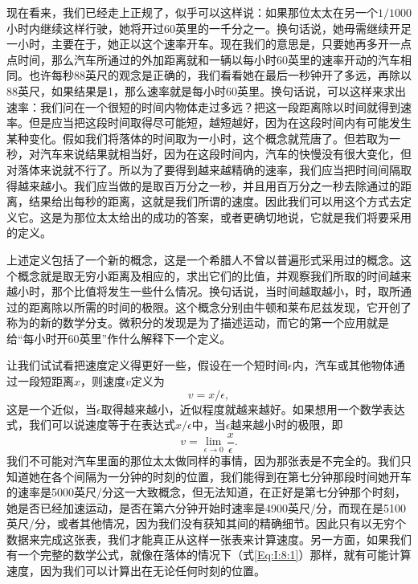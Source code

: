 现在看来，我们已经走上正规了，似乎可以这样说：如果那位太太在另一个$1/1000$小时内继续这样行驶，她将开过60英里的一千分之一。换句话说，她毋需继续开足一小时，主要在于，她正以这个速率开车。现在我们的意思是，只要她再多开一点点时间，那么汽车所通过的外加距离就和一辆以每小时60英里的速率开动的汽车相同。也许每秒88英尺的观念是正确的，我们看看她在最后一秒钟开了多远，再除以88英尺，如果结果是1，那么速率就是每小时60英里。换句话说，可以这样来求出速率：我们问在一个很短的时间内物体走过多远？把这一段距离除以时间就得到速率。但是应当把这段时间取得尽可能短，越短越好，因为在这段时间内有可能发生某种变化。假如我们将落体的时间取为一小时，这个概念就荒唐了。但若取为一秒，对汽车来说结果就相当好，因为在这段时间内，汽车的快慢没有很大变化，但对落体来说就不行了。所以为了要得到越来越精确的速率，我们应当把时间间隔取得越来越小。我们应当做的是取百万分之一秒，并且用百万分之一秒去除通过的距离，结果给出每秒的距离，这就是我们所谓的速度。因此我们可以用这个方式去定义它。这是为那位太太给出的成功的答案，或者更确切地说，它就是我们将要采用的定义。

上述定义包括了一个新的概念，这是一个希腊人不曾以普遍形式采用过的概念。这个概念就是取无穷小距离及相应的，求出它们的比值，并观察我们所取的时间越来越小时，那个比值将发生一些什么情况。换句话说，当时间越取越小，时，取所通过的距离除以所需的时间的极限。这个概念分别由牛顿和莱布尼兹发现，它开创了称为的新的数学分支。微积分的发现是为了描述运动，而它的第一个应用就是给“每小时开60英里”作什么解释下一个定义。

让我们试试看把速度定义得更好一些，假设在一个短时间$\epsilon$内，汽车或其他物体通过一段短距离$x$，则速度$v$定义为
\begin{equation*}
v=x/\epsilon,
\end{equation*}
这是一个近似，当$\epsilon$取得越来越小，近似程度就越来越好。如果想用一个数学表达式，我们可以说速度等于在表达式$x/\epsilon$中，当$\epsilon$越来越小时的极限，即
\begin{equation}
\label{Eq:I:8:3}
v=\lim_{\epsilon\to0}\frac{x}{\epsilon}.
\end{equation}
我们不可能对汽车里面的那位太太做同样的事情，因为那张表是不完全的。我们只知道她在各个间隔为一分钟的时刻的位置，我们能得到在第七分钟那段时间她开车的速率是5000英尺/分这一大致概念，但无法知道，在正好是第七分钟那个时刻，她是否已经加速运动，是否在第六分钟开始时速率是4900英尺/分，而现在是5100英尺/分，或者其他情况，因为我们没有获知其间的精确细节。因此只有以无穷个数据来完成这张表，我们才能真正从这样一张表来计算速度。另一方面，如果我们有一个完整的数学公式，就像在落体的情况下（式\ref{Eq:I:8:1}）那样，就有可能计算速度，因为我们可以计算出在无论任何时刻的位置。

